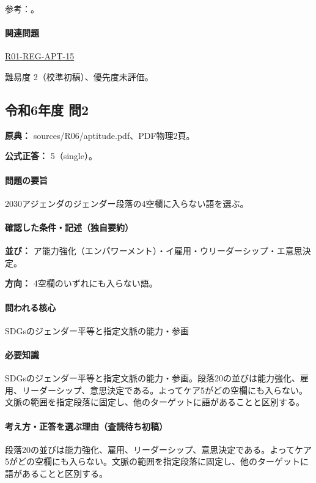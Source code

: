 \par 参考：\cite{env_sdgs_agenda,env_sdgs_un}。

\paragraph{関連問題} \hyperref[q:r01-reg-apt-15]{R01-REG-APT-15}

\par 難易度 2（校準初稿）、優先度未評価。

\subsection{令和6年度 問2}
\label{q:r06-reg-apt-02}

\noindent\textbf{原典：} sources/R06/aptitude.pdf、PDF物理2頁。

\textbf{公式正答：} 5（single）。

\paragraph{問題の要旨} 2030アジェンダのジェンダー段落の4空欄に入らない語を選ぶ。

\paragraph{確認した条件・記述（独自要約）}\mbox{}\par

\noindent\textbf{並び：} ア能力強化（エンパワーメント）・イ雇用・ウリーダーシップ・エ意思決定。\par

\noindent\textbf{方向：} 4空欄のいずれにも入らない語。\par

\paragraph{問われる核心} SDGsのジェンダー平等と指定文脈の能力・参画

\paragraph{必要知識} SDGsのジェンダー平等と指定文脈の能力・参画。段落20の並びは能力強化、雇用、リーダーシップ、意思決定である。よってケア5がどの空欄にも入らない。文脈の範囲を指定段落に固定し、他のターゲットに語があることと区別する。

\paragraph{考え方・正答を選ぶ理由（査読待ち初稿）} 段落20の並びは能力強化、雇用、リーダーシップ、意思決定である。よってケア5がどの空欄にも入らない。文脈の範囲を指定段落に固定し、他のターゲットに語があることと区別する。

